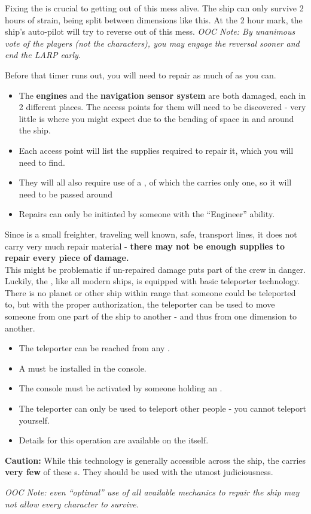 \documentclass[green]{TMFHope}
\begin{document}
\name{\gFixTheShip{}}

Fixing the \pNew{} is crucial to getting out of this mess alive. The ship can only survive 2 hours of strain, being split between dimensions like this. At the 2 hour mark, the ship's auto-pilot will try to reverse out of this mess. \emph{OOC Note: By unanimous vote of the players (not the characters), you may engage the reversal sooner and end the LARP early.}

Before that timer runs out, you will need to repair as much of \pNew{} as you can. 
\begin{itemize}
  \item The \textbf{engines} and the \textbf{navigation sensor system} are both damaged, each in 2 different places. The access points for them will need to be discovered - very little is where you might expect due to the bending of space in and around the ship. 
  \item Each access point will list the supplies required to repair it, which you will need to find. 
	\item They will all also require use of a \textbf{\iTorch{\MYname{}}}, of which the \pNew{} carries only one, so it will need to be passed around
	\item Repairs can only be initiated by someone with the ``Engineer'' ability.
\end{itemize}
Since \pNew{} is a small freighter, traveling well known, safe, transport lines, it does not carry very much repair material - \textbf{there may not be enough supplies to repair every piece of damage.}\\

This might be problematic if un-repaired damage puts part of the crew in danger. Luckily, the \pNew{}, like all modern ships, is equipped with basic teleporter technology. There is no planet or other ship within range that someone could be teleported to, but with the proper authorization, the teleporter can be used to move someone from one part of the ship to another - and thus from one dimension to another.

\begin{itemize}
  \item The teleporter can be reached from any \sConsole{}.
  \item A \iCrystal{\MYname{}} must be installed in the console.
	\item The console must be activated by someone holding an \iKey{\MYname{}}.
	\item The teleporter can only be used to teleport other people - you cannot teleport yourself.
	\item Details for this operation are available on the \sConsole{} itself.
\end{itemize}
\textbf{Caution:} While this technology is generally accessible across the ship, the \pNew{} carries \textbf{very few} of these \iCrystal{\MYname{}}s. They should be used with the utmost judiciousness. 

\emph{OOC Note: even ``optimal'' use of all available mechanics to repair the ship may not allow every character to survive.}
\end{document}
